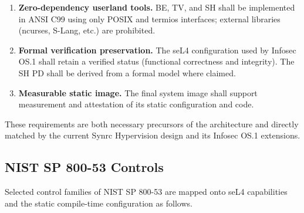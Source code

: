 \documentclass{article}
\begin{document}
\begin{enumerate}[leftmargin=*,label=\textbf{TR-\arabic*}]
  \item \textbf{Zero-dependency userland tools.}  
        BE, TV, and SH shall be implemented in ANSI C99 using only POSIX and
        termios interfaces; external libraries (ncurses, S-Lang, etc.) are
        prohibited.

  \item \textbf{Formal verification preservation.}  
        The seL4 configuration used by Infosec OS.1 shall retain a verified
        status (functional correctness and integrity). The SH PD shall be
        derived from a formal model where claimed.

  \item \textbf{Measurable static image.}  
        The final system image shall support measurement and attestation of its
        static configuration and code.
\end{enumerate}

These requirements are both necessary precursors of the architecture and
directly matched by the current Synrc Hypervision design and its Infosec OS.1
extensions.

\subsection{NIST SP 800-53 Controls}
\label{sec:nist}

Selected control families of NIST SP 800-53 are mapped onto seL4 capabilities
and the static compile-time configuration as follows.
\end{document}
